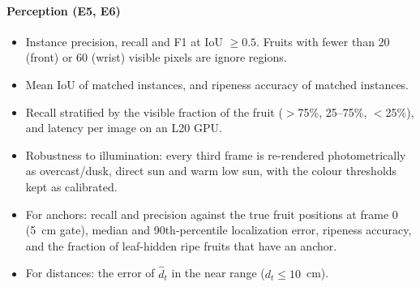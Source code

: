 \paragraph{Perception (E5, E6)}
\begin{itemize}
\item Instance precision, recall and F1 at IoU $\ge 0.5$. Fruits with fewer than 20 (front) or 60 (wrist) visible pixels are ignore regions.
\item Mean IoU of matched instances, and ripeness accuracy of matched instances.
\item Recall stratified by the visible fraction of the fruit ($>$75\%, 25--75\%, $<$25\%), and latency per image on an L20 GPU.
\item Robustness to illumination: every third frame is re-rendered photometrically as overcast/dusk, direct sun and warm low sun, with the colour thresholds kept as calibrated.
\item For anchors: recall and precision against the true fruit positions at frame 0 (5~cm gate), median and 90th-percentile localization error, ripeness accuracy, and the fraction of leaf-hidden ripe fruits that have an anchor.
\item For distances: the error of $\hat d_t$ in the near range ($d_t \le 10$~cm).
\end{itemize}

